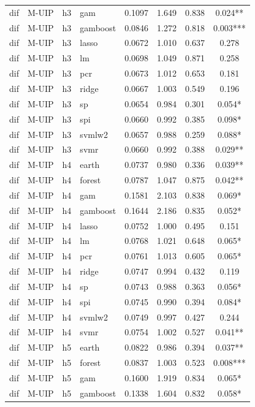 \begin{ThreePartTable}
\begin{longtable}[t]{llclcccc}
dif & M-UIP & h3 & gam & 0.1097 & 1.649 & 0.838 & 0.024**\\
dif & M-UIP & h3 & gamboost & 0.0846 & 1.272 & 0.818 & 0.003***\\
dif & M-UIP & h3 & lasso & 0.0672 & 1.010 & 0.637 & 0.278\\
dif & M-UIP & h3 & lm & 0.0698 & 1.049 & 0.871 & 0.258\\
dif & M-UIP & h3 & pcr & 0.0673 & 1.012 & 0.653 & 0.181\\
dif & M-UIP & h3 & ridge & 0.0667 & 1.003 & 0.549 & 0.196\\
dif & M-UIP & h3 & sp & 0.0654 & 0.984 & 0.301 & 0.054*\\
dif & M-UIP & h3 & spi & 0.0660 & 0.992 & 0.385 & 0.098*\\
dif & M-UIP & h3 & svmlw2 & 0.0657 & 0.988 & 0.259 & 0.088*\\
dif & M-UIP & h3 & svmr & 0.0660 & 0.992 & 0.388 & 0.029**\\
\addlinespace
dif & M-UIP & h4 & earth & 0.0737 & 0.980 & 0.336 & 0.039**\\
dif & M-UIP & h4 & forest & 0.0787 & 1.047 & 0.875 & 0.042**\\
dif & M-UIP & h4 & gam & 0.1581 & 2.103 & 0.838 & 0.069*\\
dif & M-UIP & h4 & gamboost & 0.1644 & 2.186 & 0.835 & 0.052*\\
dif & M-UIP & h4 & lasso & 0.0752 & 1.000 & 0.495 & 0.151\\
dif & M-UIP & h4 & lm & 0.0768 & 1.021 & 0.648 & 0.065*\\
dif & M-UIP & h4 & pcr & 0.0761 & 1.013 & 0.605 & 0.065*\\
dif & M-UIP & h4 & ridge & 0.0747 & 0.994 & 0.432 & 0.119\\
dif & M-UIP & h4 & sp & 0.0743 & 0.988 & 0.363 & 0.056*\\
dif & M-UIP & h4 & spi & 0.0745 & 0.990 & 0.394 & 0.084*\\
dif & M-UIP & h4 & svmlw2 & 0.0749 & 0.997 & 0.427 & 0.244\\
dif & M-UIP & h4 & svmr & 0.0754 & 1.002 & 0.527 & 0.041**\\
\addlinespace
dif & M-UIP & h5 & earth & 0.0822 & 0.986 & 0.394 & 0.037**\\
dif & M-UIP & h5 & forest & 0.0837 & 1.003 & 0.523 & 0.008***\\
dif & M-UIP & h5 & gam & 0.1600 & 1.919 & 0.834 & 0.065*\\
dif & M-UIP & h5 & gamboost & 0.1338 & 1.604 & 0.832 & 0.058*\\

\end{longtable}
\end{ThreePartTable}
